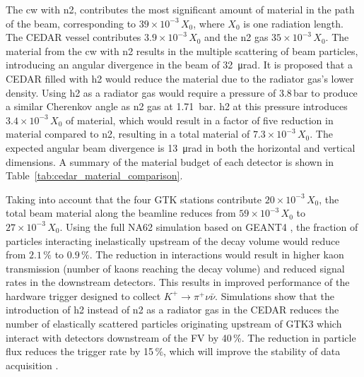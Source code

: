 \documentclass[../../main.tex]{subfiles}
\begin{document}
    The \gls{cw} with \gls{n2}, contributes the most significant amount of material in the path of the beam, corresponding to $39 \times 10^{-3}\,X_0$, 
    where $X_0$ is one radiation length. The \gls{CEDAR} vessel contributes $3.9 \times 10^{-3}\,X_0$ and the \gls{n2} gas $35 \times 10^{-3}\,X_0$.
    The material from the \gls{cw} with \gls{n2} results in the multiple scattering of beam particles, introducing an angular divergence in the beam of \SI{32}{\micro\radian}. 
    It is proposed that a \gls{CEDAR} filled with \gls{h2} would reduce the material due to the radiator gas's lower density. Using \gls{h2} as a radiator gas would require a pressure of 3.8\,bar 
    to produce a similar Cherenkov angle as \gls{n2} gas at \SI{1.71}{\bar}. \gls{h2} at this pressure introduces $3.4 \times 10^{-3}\,X_0$ of material, which would result in a factor of five reduction in material compared to \gls{n2}, resulting in a total 
    material of $7.3 \times 10^{-3}\,X_0$. The expected angular beam divergence is \SI{13}{\micro\radian} in both the horizontal and vertical dimensions. A summary of the material budget of each detector is shown in Table~\ref{tab:cedar_material_comparison}.

    \newline\indent Taking into account that the four GTK stations contribute $20 \times 10^{-3}\,X_0$, the total beam material along the beamline reduces from $59 \times 10^{-3}\,X_0$ 
    to $27 \times 10^{-3}\,X_0$. Using the full NA62 simulation based on GEANT4 \cite{Agostinelli2003Geant4}, the fraction of particles interacting inelastically upstream 
    of the decay volume would reduce from $2.1\,\%$ to $0.9\,\%$. 
    The reduction in interactions would result in higher kaon transmission (number of kaons reaching the decay volume) and reduced signal rates in the downstream detectors. %
    This results in improved performance of the hardware trigger designed to collect $K^+ \to \pi^+ \nu \bar{\nu}$. Simulations show that the introduction of \gls{h2} instead of \gls{n2} as a radiator gas in the \gls{CEDAR} reduces the number of elastically scattered particles originating upstream of GTK3 which interact with detectors downstream of the \gls{FV} by 40\,\%. 
    The reduction in particle flux reduces the trigger rate by 15\,\%, which will improve the stability of data acquisition \cite{NA62:2023mud}. 
\end{document}
